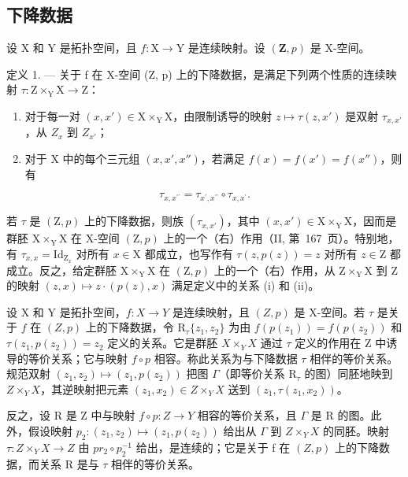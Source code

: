 \subsection{下降数据}

设 X 和 Y 是拓扑空间，且 \(f \colon \mathrm{X} \to \mathrm{Y}\) 是连续映射。设 \((\mathbf{Z}, p)\) 是 X-空间。

定义 1. --- 关于 f 在 X-空间 (Z, p) 上的下降数据，是满足下列两个性质的连续映射 \(\tau\colon \mathrm{Z}\times_{\mathrm{Y}}\mathrm{X}\to\mathrm{Z}\)：

\begin{enumerate}
\def\labelenumi{(\roman{enumi})}
\item
  对于每一对 \((x, x') \in \mathrm{X} \times_{\mathrm{Y}} \mathrm{X}\)，由限制诱导的映射 \(z \mapsto \tau(z, x')\) 是双射 \(\tau_{x,x'}\)，从 \(Z_x\) 到 \(Z_{x'}\)；
\item
  对于 X 中的每个三元组 \((x,x',x'')\)，若满足 \(f(x)=f(x')=f(x'')\)，则有
\end{enumerate}

\[
\tau_ {x, x ^ {\prime \prime}} = \tau_ {x ^ {\prime}, x ^ {\prime \prime}} \circ \tau_ {x, x ^ {\prime}}.
\]

若 \(\tau\) 是 \((\mathrm{Z},p)\) 上的下降数据，则族 \((\tau_{x,x'})\)，其中 \((x,x')\in \mathrm{X}\times_{\mathrm{Y}}\mathrm{X}\)，因而是群胚 \(\mathrm{X}\times_{\mathrm{Y}}\mathrm{X}\) 在 X-空间 \((\mathrm{Z},p)\) 上的一个（右）作用（II, 第~167~页）。特别地，有 \(\tau_{x,x} = \mathrm{Id}_{\mathrm{Z}_x}\) 对所有 \(x\in \mathrm{X}\) 都成立，也写作有 \(\tau (z,p(z)) = z\) 对所有 \(z\in \mathrm{Z}\) 都成立。反之，给定群胚 \(\mathrm{X}\times_{\mathrm{Y}}\mathrm{X}\) 在 \((\mathrm{Z},p)\) 上的一个（右）作用，从 \(\mathrm{Z}\times_{\mathrm{Y}}\mathrm{X}\) 到 Z 的映射 \((z,x)\mapsto z\cdot (p(z),x)\) 满足定义中的关系 (i) 和 (ii)。

设 X 和 Y 是拓扑空间，\(f\colon X\to Y\) 是连续映射，且 \((Z,p)\) 是 X-空间。若 \(\tau\) 是关于 \(f\) 在 \((Z,p)\) 上的下降数据，令 \(\mathrm{R}_{\tau}\{z_{1},z_{2}\}\) 为由 \(f(p(z_{1})) = f(p(z_{2}))\) 和 \(\tau (z_1,p(z_2)) = z_2\) 定义的关系。它是群胚 \(X\times_Y X\) 通过 \(\tau\) 定义的作用在 Z 中诱导的等价关系；它与映射 \(f\circ p\) 相容。称此关系为与下降数据 \(\tau\) 相伴的等价关系。规范双射 \((z_{1},z_{2})\mapsto (z_{1},p(z_{2}))\) 把图 \(\Gamma\)（即等价关系 \(\mathrm{R}_{\tau}\) 的图）同胚地映到 \(Z\times_Y X\)，其逆映射把元素 \((z_{1},x_{2})\in Z\times_Y X\) 送到 \((z_{1},\tau (z_{1},x_{2}))\)。

反之，设 R 是 Z 中与映射 \(f \circ p: Z \to Y\) 相容的等价关系，且 \(\Gamma\) 是 R 的图。此外，假设映射 \(p_{2}: (z_{1}, z_{2}) \mapsto (z_{1}, p(z_{2}))\) 给出从 \(\Gamma\) 到 \(Z \times_{Y} X\) 的同胚。映射 \(\tau: Z \times_{Y} X \to Z\) 由 \(pr_{2} \circ p_{2}^{-1}\) 给出，是连续的；它是关于 f 在 \((Z, p)\) 上的下降数据，而关系 R 是与 \(\tau\) 相伴的等价关系。

